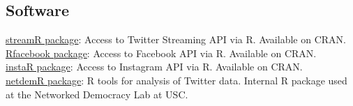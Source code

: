 \documentclass[margin,line,11pt]{resume}
\newcommand{\nl}{\vspace{0.10in}\\}
\begin{document}
\begin{resume}

    
   
    




    
        \section{\mysidestyle Software}
    
\href{http://cran.r-project.org/web/packages/streamR/}{streamR package}: Access to Twitter Streaming API via R. Available on CRAN. \nl
\href{http://cran.r-project.org/web/packages/Rfacebook/index.html}{Rfacebook package}: Access to Facebook API via R. Available on CRAN. \nl
\href{http://cran.r-project.org/web/packages/instaR/index.html}{instaR package}: Access to Instagram API via R. Available on CRAN. \nl
\href{https://github.com/netdem-USC/netdemR}{netdemR package}: R tools for analysis of Twitter data. Internal R package used at the Networked Democracy Lab at USC. 

\newpage


\end{resume}
\end{document}
